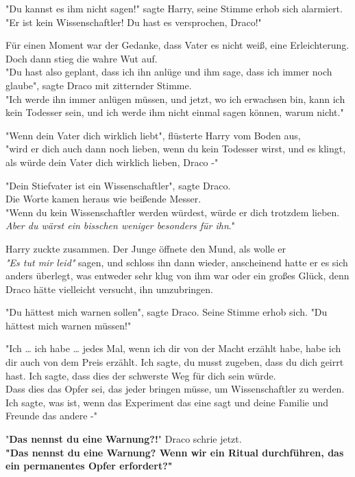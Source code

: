 {"Du kannst es ihm nicht sagen!" sagte Harry, seine Stimme erhob sich alarmiert.\\ "Er ist kein Wissenschaftler! Du hast es versprochen, Draco!"

Für einen Moment war der Gedanke, dass Vater es nicht weiß, eine Erleichterung.\\ Doch dann stieg die wahre Wut auf.\\ "Du hast also geplant, dass ich ihn anlüge und ihm sage, dass ich immer noch glaube", sagte Draco mit zitternder Stimme.\\ "Ich werde ihn immer anlügen müssen, und jetzt, wo ich erwachsen bin, kann ich kein Todesser sein, und ich werde ihm nicht einmal sagen können, warum nicht."

"Wenn dein Vater dich wirklich liebt", flüsterte Harry vom Boden aus,\\ "wird er dich auch dann noch lieben, wenn du kein Todesser wirst, und es klingt, als würde dein Vater dich wirklich lieben, Draco -"

"Dein Stiefvater ist ein Wissenschaftler", sagte Draco.\\ Die Worte kamen heraus wie beißende Messer.\\ "Wenn du kein Wissenschaftler werden würdest, würde er dich trotzdem lieben.\\ \emph{Aber du wärst ein bisschen weniger besonders für ihn}."

Harry zuckte zusammen. Der Junge öffnete den Mund, als wolle er\\ \emph{"Es tut mir leid"} sagen, und schloss ihn dann wieder, anscheinend hatte er es sich anders überlegt, was entweder sehr klug von ihm war oder ein großes Glück, denn Draco hätte vielleicht versucht, ihn umzubringen.

"Du hättest mich warnen sollen", sagte Draco. Seine Stimme erhob sich. "Du hättest mich warnen müssen!"

"Ich … ich habe … jedes Mal, wenn ich dir von der Macht erzählt habe, habe ich dir auch von dem Preis erzählt. Ich sagte, du musst zugeben, dass du dich geirrt hast. Ich sagte, dass dies der schwerste Weg für dich sein würde.\\ Dass dies das Opfer sei, das jeder bringen müsse, um Wissenschaftler zu werden. Ich sagte, was ist, wenn das Experiment das eine sagt und deine Familie und Freunde das andere -"

"\textbf{Das nennst du eine Warnung?!}" Draco schrie jetzt.\\ \textbf{"Das nennst du eine Warnung? Wenn wir ein Ritual durchführen, das ein permanentes Opfer erfordert?"}

}
